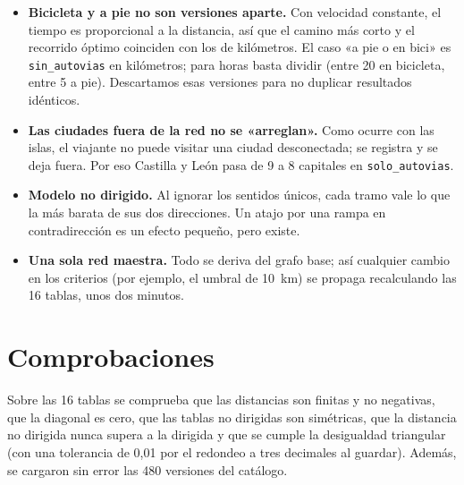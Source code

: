 \begin{itemize}
  \item \textbf{Bicicleta y a pie no son versiones aparte.} Con velocidad constante, el tiempo es proporcional a la distancia, así que el camino más corto y el recorrido óptimo coinciden con los de kilómetros.
        El caso «a pie o en bici» es \texttt{sin\_autovias} en kilómetros; para horas basta dividir (entre 20 en bicicleta, entre 5 a pie). Descartamos esas versiones para no duplicar resultados idénticos.
  \item \textbf{Las ciudades fuera de la red no se «arreglan».} Como ocurre con las islas, el viajante no puede visitar una ciudad desconectada; se registra y se deja fuera. Por eso Castilla y León pasa de 9 a 8 capitales en \texttt{solo\_autovias}.
  \item \textbf{Modelo no dirigido.} Al ignorar los sentidos únicos, cada tramo vale lo que la más barata de sus dos direcciones. Un atajo por una rampa en contradirección es un efecto pequeño, pero existe.
  \item \textbf{Una sola red maestra.} Todo se deriva del grafo base; así cualquier cambio en los criterios (por ejemplo, el umbral de 10~km) se propaga recalculando las 16 tablas, unos dos minutos.
\end{itemize}

\section{Comprobaciones}

Sobre las 16 tablas se comprueba que las distancias son finitas y no negativas, que la diagonal es cero, que las tablas no dirigidas son simétricas, que la distancia no dirigida nunca supera a la dirigida y que se cumple la
desigualdad triangular (con una tolerancia de 0,01 por el redondeo a tres decimales al guardar). Además, se cargaron sin error las 480 versiones del catálogo.
